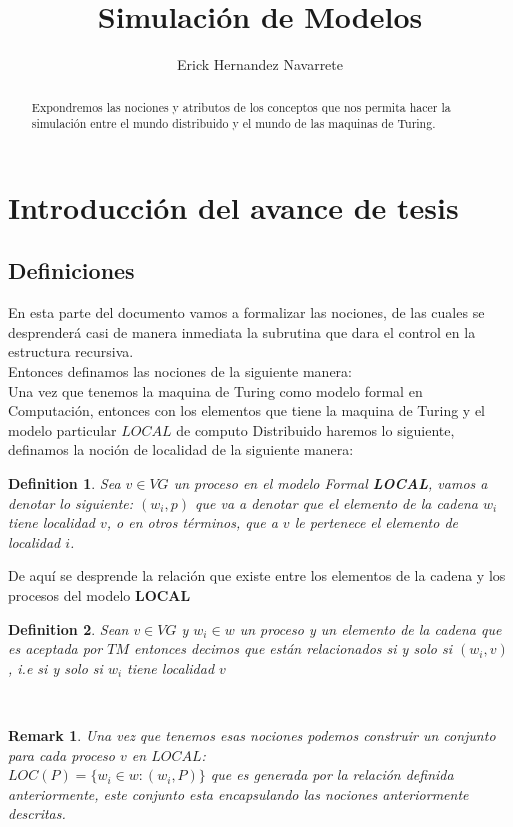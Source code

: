 \documentclass[10pt]{article}
\author{Erick Hernandez Navarrete}
\title{Simulación de Modelos}
\newtheorem*{remark}{Remark}
\newtheorem{definition}{Definition}
\begin{document}
    \maketitle
    \section{Introducción del avance de tesis}\label{sec:introducción-del-avance-de-tesis}     %

    \begin{abstract}
        Expondremos las nociones y atributos de los conceptos que nos permita
        hacer la simulación entre el mundo distribuido y el mundo de las maquinas
        de Turing.
    \end{abstract}
    \space
    \subsection{Definiciones}\label{subsec:definiciones}
    En esta parte del documento vamos a formalizar las nociones, de las cuales se desprenderá casi de manera
    inmediata la subrutina que dara el control en la estructura recursiva.\\
    Entonces definamos las nociones de la siguiente manera:
    \\
    Una vez que tenemos la maquina de Turing como modelo formal en Computación, entonces con los elementos que tiene la
    maquina de Turing y el modelo particular $LOCAL$ de computo Distribuido haremos lo siguiente, definamos la noción de localidad de la siguiente manera:

    \theoremstyle{definition}
    \begin{definition}
        Sea $v \in VG$ un proceso en el modelo Formal \textbf{LOCAL}, vamos a denotar lo siguiente:
        $(w_{i},p)$ que va a denotar que el elemento de la cadena $w_{i}$ tiene localidad $v$,
        o en otros términos, que a $v$ le pertenece el elemento de localidad $i$.
    \end{definition}
    De aquí se desprende la relación que existe entre los elementos de la cadena y los procesos
    del modelo $\textbf{LOCAL}$

    \theoremstyle{definition}
    \begin{definition}
        Sean $v \in VG$ y $w_{i} \in w$ un proceso y un elemento de la cadena que es aceptada por $TM$
        entonces decimos que están relacionados si y solo si $(w_{i},v)$, i.e si y solo si $w_{i}$ tiene localidad $v$
    \end{definition}
    \\
    \begin{remark}
        Una vez que tenemos esas nociones podemos construir un conjunto para cada proceso $v$ en $LOCAL$:\\
        $LOC(P) = \{w_{i} \in w : (w_{i},P)\}$  que es generada por la relación definida anteriormente,
        este conjunto esta encapsulando las nociones anteriormente descritas.
    \end{remark}
\end{document}
